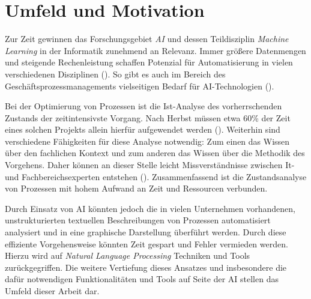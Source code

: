 \section{Umfeld und Motivation}

Zur Zeit gewinnen das Forschungsgebiet \textit{\ac{AI}} und dessen Teildisziplin \textit{Machine Learning} in der Informatik zunehmend an Relevanz. Immer größere Datenmengen und steigende Rechenleistung schaffen Potenzial für Automatisierung in vielen verschiedenen Disziplinen (\cite[vgl.][1]{AIRELEVANCE}). So gibt es auch im Bereich des Geschäftsprozessmanagements vielseitigen Bedarf für AI-Technologien (\cite[vgl.][1]{BPMAIRELEVANCE}).\par
Bei der Optimierung von Prozessen ist die Ist-Analyse des vorherrschenden Zustands der zeitintensivste Vorgang. Nach Herbst müssen etwa 60\% der Zeit eines solchen Projekts allein hierfür aufgewendet werden (\cite[vgl.][1]{HERBST}). 
Weiterhin sind verschiedene Fähigkeiten für diese Analyse notwendig: Zum einen das Wissen über den fachlichen Kontext und zum anderen das Wissen über die Methodik des Vorgehens. Daher können an dieser Stelle leicht Missverständnisse zwischen It- und Fachbereichsexperten entstehen (\cite[vgl.][1]{HERBST}). Zusammenfassend ist die Zustandsanalyse von Prozessen mit hohem Aufwand an Zeit und Ressourcen verbunden.\par
Durch Einsatz von \ac{AI} könnten jedoch die in vielen Unternehmen vorhandenen, unstrukturierten textuellen Beschreibungen von Prozessen automatisiert analysiert und in eine graphische Darstellung überführt werden. Durch diese effiziente Vorgehensweise könnten Zeit gespart und Fehler vermieden werden. Hierzu wird auf \textit{Natural Language Processing} Techniken und Tools zurückgegriffen. Die weitere Vertiefung dieses Ansatzes und insbesondere die dafür notwendigen Funktionalitäten und Tools auf Seite der \ac{AI} stellen das Umfeld dieser Arbeit dar.
